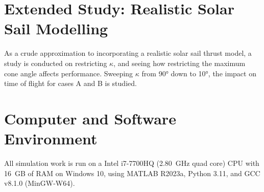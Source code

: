 
\section{Extended Study: Realistic Solar Sail Modelling}
As a crude approximation to incorporating a realistic solar sail thrust model, a study is conducted on restricting \(\kappa\), and seeing how restricting the maximum cone angle affects performance. Sweeping \(\kappa\) from \ang{90} down to \ang{10}, the impact on time of flight for cases A and B is studied.

\section{Computer and Software Environment}
All simulation work is run on a Intel i7-7700HQ (\qty{2.80}{GHz} quad core) CPU with \qty{16}{GB} of RAM on Windows 10, using MATLAB R2023a, Python 3.11, and GCC v8.1.0 (MinGW-W64).

